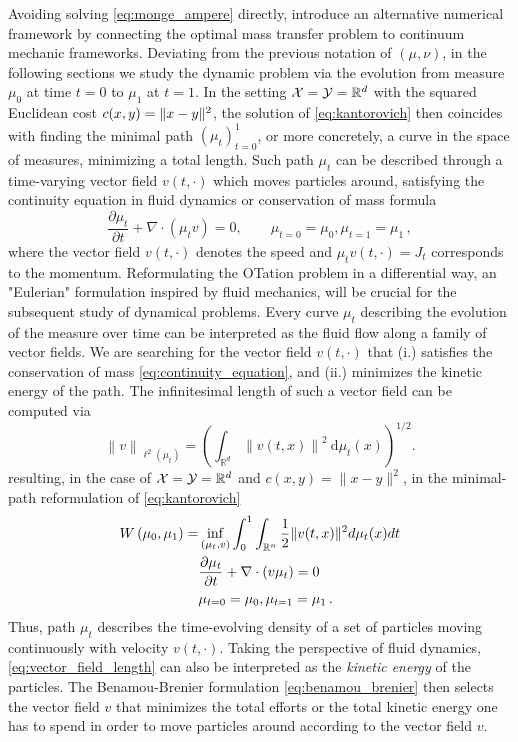 Avoiding solving \eqref{eq:monge_ampere} directly, \citet{benamou2000computational} introduce an alternative numerical framework by connecting the optimal mass transfer problem to continuum mechanic frameworks.
Deviating from the previous notation of $(\mu, \nu)$, in the following sections we study the dynamic problem via the evolution from measure $\mu_0$ at time $t=0$ to $\mu_1$ at $t=1$. 
In the setting ${\mathcal{X}} = {\mathcal{Y}} = \mathbb{R}^d$ with the squared Euclidean cost $c(x, y) = \lVert x-y\rVert^2$, the solution of \eqref{eq:kantorovich} then coincides with finding the minimal path $(\mu_t)_{t=0}^1$, or more concretely, a curve in the space of measures, minimizing a total length.  
Such path $\mu_t$ can be described through a time-varying vector field $v(t, \cdot)$ which moves particles around, satisfying the continuity equation in fluid dynamics or conservation of mass formula
\begin{equation} \label{eq:continuity_equation}
	\frac{\partial \mu_t}{\partial t}+\nabla \cdot \left(\mu_t v\right)= 0, \qquad \mu_{t=0}=\mu_0, \mu_{t=1}=\mu_1\,,
\end{equation}
where the vector field $v(t, \cdot)$ denotes the speed and $\mu_t v(t, \cdot) = J_t$ corresponds to the momentum.
Reformulating the \acrlong{OT}ation problem in a differential way, an "Eulerian" formulation inspired by fluid mechanics, will be crucial for the subsequent study of dynamical problems.
Every curve $\mu_t$ describing the evolution of the measure over time can be interpreted as the fluid flow along a family of vector fields. We are searching for the vector field $v(t, \cdot)$ that (i.) satisfies the conservation of mass \eqref{eq:continuity_equation}, and (ii.) minimizes the kinetic energy of the path.
The infinitesimal length of such a vector field can be computed via 
\begin{equation} \label{eq:vector_field_length}
	\left\|v\right\|_{\ell^2\left(\mu_t\right)}=\left(\int_{\mathbb{R}^d}\left\|v(t, x)\right\|^2 \mathrm{~d} \mu_t(x)\right)^{1 / 2}.
\end{equation}
resulting, in the case of ${\mathcal{X}} = {\mathcal{Y}} = \mathbb{R}^d$ and $c(x, y)=\|x-y\|^2$, in the minimal-path reformulation of \eqref{eq:kantorovich}
\begin{align}  \label{eq:benamou_brenier}
	W\left(\mu_0, \mu_1\right)=& \inf _{(\mu_t, v)} \int_0^1 \int_{\mathbb{R}^n}\frac{1}{2}\lVert v(t, x)\rVert^2 d\mu_t(x) d t \\
	& \nonumber \frac{\partial \mu_t}{\partial t}+\nabla \cdot(v \mu_t)=0 \\
	& \nonumber \mu_{t=0}=\mu_0, \mu_{t=1}=\mu_1\, .
\end{align}
Thus, path $\mu_t$ describes the time-evolving density of a set of particles moving continuously with velocity $v(t, \cdot)$.
Taking the perspective of fluid dynamics, \eqref{eq:vector_field_length} can also be interpreted as the \emph{kinetic energy} of the particles.
The Benamou-Brenier formulation \eqref{eq:benamou_brenier} then selects the vector field $v$ that minimizes the total efforts or the total kinetic energy one has to spend in order to move particles around according to the vector field $v$. \\



